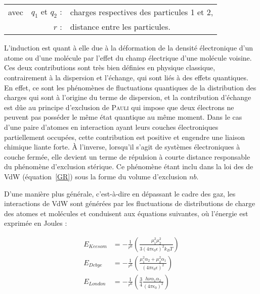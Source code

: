 \begin{flushleft}
\begin{tabular}{@{}lrp{10cm}}
avec & $q_{1}$ et $q_{2}$ : & charges respectives des particules 1 et 2, \\
& $r$ : & distance entre les particules. 
\end{tabular}
\end{flushleft}

L'induction est quant à elle due à la déformation de la densité électronique d'un atome ou d'une molécule par l'effet du champ électrique d'une molécule voisine. Ces deux contributions sont très bien définies en physique classique, contrairement à la dispersion et l'échange, qui sont liés à des effets quantiques.
En effet, ce sont les phénomènes de fluctuations quantiques de la distribution des charges qui sont à l'origine du terme de dispersion, et la contribution d'échange est dûe au principe d'exclusion de \textsc{Pauli} qui impose que deux électrons ne peuvent pas posséder le même état quantique au même moment. Dans le cas d'une paire d'atomes en interaction ayant leurs couches électroniques partiellement occupées, cette contribution est positive et engendre une liaison chimique liante forte. À l'inverse, lorsqu'il s'agit de systèmes électroniques à couche fermée, elle devient un terme de répulsion à courte distance responsable du phénomène d'exclusion stérique. Ce phénomène étant inclu dans la loi des \og {} de VdW (équation~\ref{GR}) sous la forme du volume d'exclusion $nb$.  


D'une manière plus générale, c'est-à-dire en dépassant le cadre des gaz, les interactions de VdW sont générées par les fluctuations de distributions de charge des atomes et molécules et conduisent aux équations suivantes, où l'énergie est exprimée en Joules :

\begin{align}
E_{Keesom} &= - \frac{1}{r^{6}} \left(\frac{\mu_{1}^{2}\mu_{2}^{2}}{3(4\pi \epsilon_{0} \epsilon)^{2} k_{B}T}\right) \\
E_{Debye} &= - \frac{1}{r^{6}} \left(\frac{\mu_{1}^{2}\alpha_{2}+\mu_{2}^{2}\alpha_{1}}{(4\pi \epsilon_{0} \epsilon)^{2}}\right) \\
E_{London} &= - \frac{1}{r^{6}} \left(\frac{3}{4}\frac{h\nu\alpha_{1}\alpha_{2}}{(4\pi \epsilon_{0})^{2}}\right)
\end{align}

